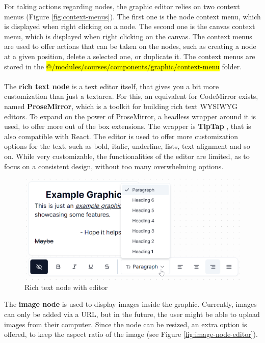 \noindent For taking actions regarding nodes, the graphic editor relies on two context menus (Figure \ref{fig:context-menus}). The first one is the node context menu, which is displayed when right clicking on a node. The second one is the canvas context menu, which is displayed when right clicking on the canvas. The context menus are used to offer actions that can be taken on the nodes, such as creating a node at a given position, delete a selected one, or duplicate it. The context menus are stored in the \hl{@/modules/courses/components/graphic/context-menu} folder.
\\\\
\noindent The \textbf{rich text node} is a text editor itself, that gives you a bit more customization than just a textarea. For this, an equivalent for CodeMirror exists, named \textbf{ProseMirror}, which is a toolkit for building rich text WYSIWYG editors. To expand on the power of ProseMirror, a headless wrapper around it is used, to offer more out of the box extensions. The wrapper is \textbf{TipTap} \cite{tiptap}, that is also compatible with React. The editor is used to offer more customization options for the text, such as bold, italic, underline, lists, text alignment and so on. While very customizable, the functionalities of the editor are limited, as to focus on a consistent design, without too many overwhelming options.

\begin{figure}[hbt!]
    \centering
    \includegraphics[scale=0.62]{images/rich-text-node.png}
    \caption{Rich text node with editor}
    \label{fig:rich-text-node}
\end{figure}

\noindent The \textbf{image node} is used to display images inside the graphic. Currently, images can only be added via a URL, but in the future, the user might be able to upload images from their computer. Since the node can be resized, an extra option is offered, to keep the aspect ratio of the image (see Figure \ref{fig:image-node-editor}).

